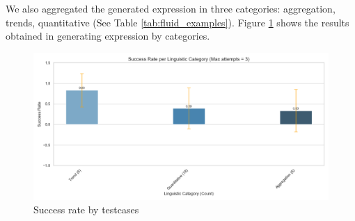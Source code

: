 We also aggregated the generated expression in three categories: aggregation, trends, quantitative (See Table \ref{tab:fluid_examples}).
Figure \ref{fig:success_rate_by_category} shows the results obtained in generating expression by categories.

\begin{figure}[!h]
    \centering
    \includegraphics[width=0.95\linewidth]{fig/success_rate_by_category}
    \caption{Success rate by testcases}\label{fig:success_rate_by_category}
\end{figure}
